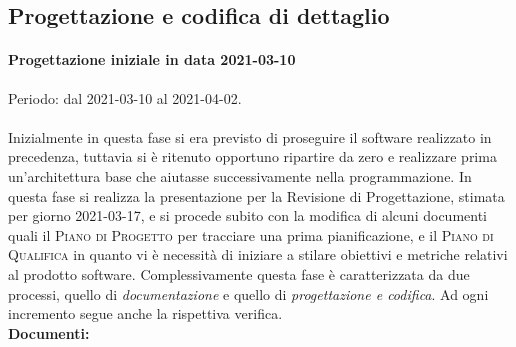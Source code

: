 \documentclass[../piano_di_progetto.tex]{subfiles}
\begin{document}

\subsection{Progettazione e codifica di dettaglio}%
\label{sub:prog_dett}
\paragraph{Progettazione iniziale in data 2021-03-10}
Periodo: dal 2021-03-10 al 2021-04-02.\\ \\
Inizialmente in questa fase si era previsto di proseguire il software realizzato in precedenza, tuttavia si è ritenuto opportuno ripartire da zero e realizzare prima un'architettura 
base che aiutasse successivamente nella programmazione. 
In questa fase si realizza la presentazione per la Revisione di Progettazione, stimata per giorno 2021-03-17, e si procede subito con la modifica di alcuni documenti quali
il \textsc{Piano di Progetto} per tracciare una prima pianificazione, e il \textsc{Piano di Qualifica} in quanto vi è necessità di iniziare a stilare obiettivi e metriche relativi al prodotto software.
Complessivamente questa fase è caratterizzata da due processi, quello di \emph{documentazione} e quello di \emph{progettazione e codifica}. Ad ogni incremento segue anche la rispettiva verifica. \\
\textbf{Documenti:}
\end{document}
